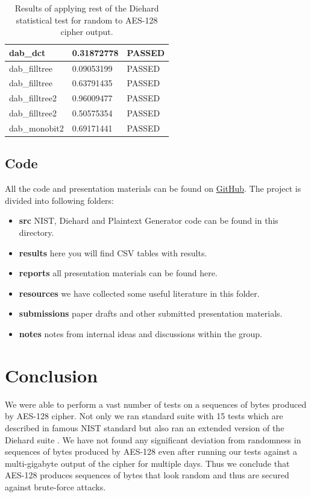 \documentclass[conference]{IEEEtran}
\begin{document}
\begin{center}
\begin{table}
\begin{tabular}{|l|l|l|}
dab\_dct                               & 0.31872778 & PASSED \\ \hline
dab\_filltree                          & 0.09053199 & PASSED \\ \hline
dab\_filltree                          & 0.63791435 & PASSED \\ \hline
dab\_filltree2                         & 0.96009477 & PASSED \\ \hline
dab\_filltree2                         & 0.50575354 & PASSED \\ \hline
dab\_monobit2                          & 0.69171441 & PASSED \\ \hline
\end{tabular}
\caption{Results of applying rest of the Diehard statistical test for random to AES-128 cipher output.}
\label{dieharderesults3}
\end{table}
\end{center}

\subsection{Code}
All the code and presentation materials can be found on \href{https://urlzs.com/kUsF}{GitHub}. The project is divided into following folders:

\begin{itemize}
  \item \textbf{src} NIST, Diehard and Plaintext Generator code can be found in this directory.
  \item \textbf{results} here you will find CSV tables with results.
  \item \textbf{reports} all presentation materials can be found here.
  \item \textbf{resources} we have collected some useful literature in this folder.
  \item \textbf{submissions} paper drafts and other submitted presentation materials.
   \item \textbf{notes} notes from internal ideas and discussions within the group. 
\end{itemize}

\section{Conclusion}
We were able to perform a vast number of tests on a sequences of bytes produced by AES-128 cipher. Not only we ran standard suite with 15 tests which are described in famous NIST standard \cite{nisttests} but also ran an extended version of the Diehard suite \cite{diehardtests}. We have not found any significant deviation from randomness in sequences  of bytes produced by AES-128 even after running our tests against a multi-gigabyte output of the cipher for multiple days. Thus we conclude that AES-128 produces sequences of bytes that look random and thus are secured against brute-force attacks. 
\end{document}
